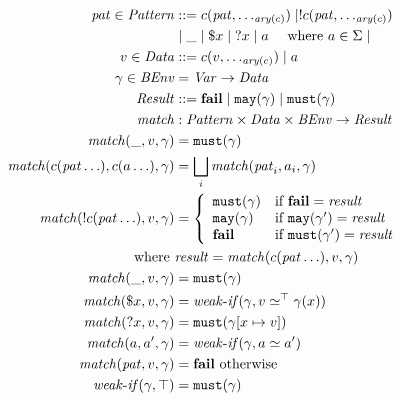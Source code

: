 \documentclass[preprint,onecolumn,9pt]{sigplanconf} %
\begin{document}
\begin{figure}
  \begin{align*}
    \mpat \in \Pattern &::= \mconstructor(\mpat, \ldots_{\ary(\mconstructor)}) \alt \snonevent{\mconstructor(\mpat, \ldots_{\ary(\mconstructor)})} \\
     & \alt \swc \alt \sref{\mvar} \alt \sbind{\mvar} \alt \matom
      \quad\text{ where } \matom \in \Sigma \alt
\\
    \mdata \in \Qualified &::= \mconstructor(\mdata, \ldots_{\ary(\mconstructor)}) \alt \matom
\\
    \mbindenv \in \BindEnv &= \Var \to \Qualified
\\
    \MatchResult &::= \mfail \alt \smay{\mbindenv} \alt \smust{\mbindenv}
\\
    \match &: \Pattern \times \Qualified \times \BindEnv \to \MatchResult
\\
    \match(\swc, \mdata, \mbindenv) &= \smust{\mbindenv}
\\
    \match(\mconstructor(\mpat \ldots), \mconstructor(\matom \ldots), \mbindenv) &=
      \bigsqcup\limits_i{\match(\mpat_i, \matom_i, \mbindenv)}
\\
    \match(\snonevent{\mconstructor(\mpat \ldots)}, \mdata, \mbindenv) &=
      \left\{\begin{array}{ll}
               \smust{\mbindenv} & \text{if } \mfail = \mres \\
               \smay{\mbindenv} & \text{if } \smay{\mbindenv'} = \mres \\
               \mfail & \text{if } \smust{\mbindenv'} = \mres \\
             \end{array}\right.
    \\ \text{where }& \mres = \match(\mconstructor(\mpat \ldots), \mdata, \mbindenv)
\\
    \match(\swc, \mdata, \mbindenv) &= \smust{\mbindenv}
\\
    \match(\sref{\mvar}, \mdata, \mbindenv) &= \weakif(\mbindenv, \mdata \simeq^\top \mbindenv(\mvar))
\\
    \match(\sbind{\mvar}, \mdata, \mbindenv) &= \smust{\mbindenv[\mvar \mapsto \mdata]}
\\
    \match(\matom, \matom', \mbindenv) &= \weakif(\mbindenv, \matom \simeq \matom')
\\
    \match(\mpat, \mdata, \mbindenv) &= \mfail \text{ otherwise}
\\
    \weakif(\mbindenv, \top) &= \smust{\mbindenv}
\\

\end{align*}
\end{figure}
\end{document}
